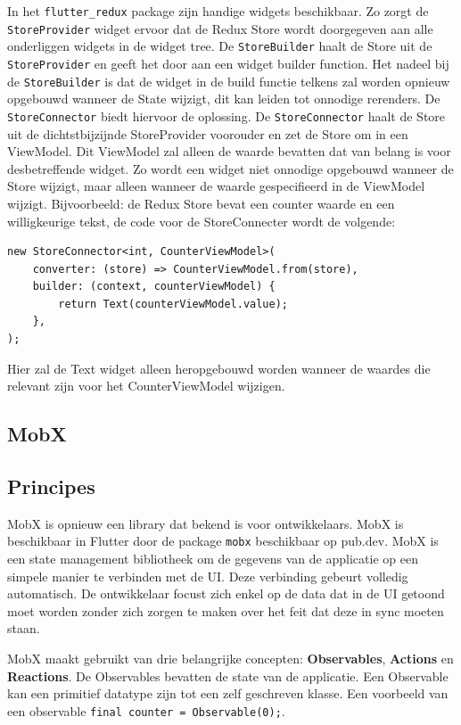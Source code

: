 In het \verb|flutter_redux| package zijn handige widgets beschikbaar. Zo zorgt de \verb|StoreProvider| widget ervoor dat de Redux Store wordt doorgegeven aan alle onderliggen widgets in de widget tree. De \verb|StoreBuilder| haalt de Store uit de \verb|StoreProvider| en geeft het door aan een widget builder function. Het nadeel bij de \verb|StoreBuilder| is dat de widget in de build functie telkens zal worden opnieuw opgebouwd wanneer de State wijzigt, dit kan leiden tot onnodige rerenders. De \verb|StoreConnector| biedt hiervoor de oplossing. De \verb|StoreConnector| haalt de Store uit de dichtstbijzijnde StoreProvider voorouder en zet de Store om in een ViewModel. Dit ViewModel zal alleen de waarde bevatten dat van belang is voor desbetreffende widget. Zo wordt een widget niet onnodige opgebouwd wanneer de Store wijzigt, maar alleen wanneer de waarde gespecifieerd in de ViewModel wijzigt. Bijvoorbeeld: de Redux Store bevat een counter waarde en een willigkeurige tekst, de code voor de StoreConnecter wordt de volgende: 

\begin{verbatim}
new StoreConnector<int, CounterViewModel>(
    converter: (store) => CounterViewModel.from(store),
    builder: (context, counterViewModel) {
        return Text(counterViewModel.value);
    },
);
\end{verbatim}
Hier zal de Text widget alleen heropgebouwd worden wanneer de waardes die relevant zijn voor het CounterViewModel wijzigen.


\subsection{MobX}
\subsection*{Principes}
MobX is opnieuw een library dat bekend is voor ontwikkelaars. MobX is beschikbaar in Flutter door de package \verb|mobx| beschikbaar op pub.dev. MobX is een state management bibliotheek om de gegevens van de applicatie op een simpele manier te verbinden met de UI. Deze verbinding gebeurt volledig automatisch. De ontwikkelaar focust zich enkel op de data dat in de UI getoond moet worden zonder zich zorgen te maken over het feit dat deze in sync moeten staan.

MobX maakt gebruikt van drie belangrijke concepten: \textbf{Observables}, \textbf{Actions} en \textbf{Reactions}.
\newline
De Observables bevatten de state van de applicatie. Een Observable kan een primitief datatype zijn tot een zelf geschreven klasse. Een voorbeeld van een observable \verb|final counter = Observable(0);|.

